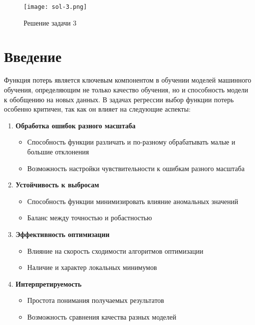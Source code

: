 \begin{figure}[h]
	\centering
	\texttt{[image: sol-3.png]}
	\caption{Решение задачи 3}
	\label{img:sol-3}
\end{figure}







\section{Введение}

Функция потерь является ключевым компонентом в обучении моделей машинного обучения, определяющим не только качество обучения, но и способность модели к обобщению на новых данных. В задачах регрессии выбор функции потерь особенно критичен, так как он влияет на следующие аспекты:

\begin{enumerate}
    \item \textbf{Обработка ошибок разного масштаба}
    \begin{itemize}
        \item Способность функции различать и по-разному обрабатывать малые и большие отклонения
        \item Возможность настройки чувствительности к ошибкам разного масштаба
    \end{itemize}

    \item \textbf{Устойчивость к выбросам}
    \begin{itemize}
        \item Способность функции минимизировать влияние аномальных значений
        \item Баланс между точностью и робастностью
    \end{itemize}

    \item \textbf{Эффективность оптимизации}
    \begin{itemize}
        \item Влияние на скорость сходимости алгоритмов оптимизации
        \item Наличие и характер локальных минимумов
    \end{itemize}

    \item \textbf{Интерпретируемость}
    \begin{itemize}
        \item Простота понимания получаемых результатов
        \item Возможность сравнения качества разных моделей
    \end{itemize}
\end{enumerate}


